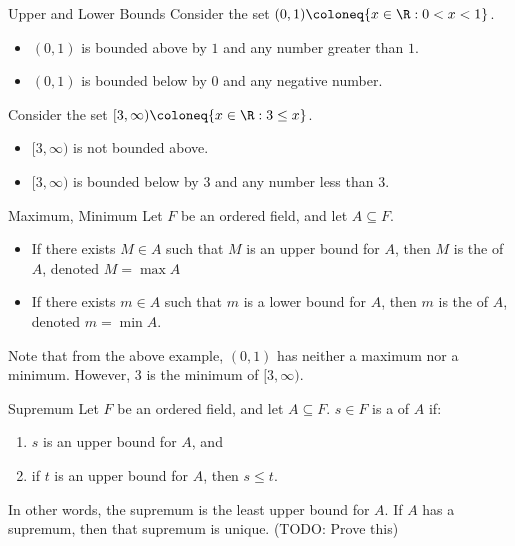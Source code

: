 \begin{exbox}{Upper and Lower Bounds}{}
    Consider the set $ (0,1) \coloneq \{ x \in \R : 0<x<1\}$.
    \begin{itemize}[noitemsep]
        \item $(0,1)$ is bounded above by $1$ and any number greater than $1$.
        \item $(0,1)$ is bounded below by $0$ and any negative number.
    \end{itemize}
    Consider the set $[3, \infty) \coloneq \{ x \in \R : 3 \leq x \}$.
    \begin{itemize}[noitemsep]
        \item $[3, \infty)$ is not bounded above.
        \item $[3, \infty)$ is bounded below by $3$ and any number less than $3$.
    \end{itemize}
\end{exbox}

\begin{dfnbox}{Maximum, Minimum}{}
    Let $F$ be an ordered field, and let $A \subseteq F$.
    \begin{itemize}[noitemsep]
        \item If there exists $M \in A$ such that $M$ is an upper bound for $A$, then $M$ is the  of $A$, denoted $M = \max A$
        \item If there exists $m \in A$ such that $m$ is a lower bound for $A$, then $m$ is the  of $A$, denoted $m = \min A$.
    \end{itemize}
\end{dfnbox}

Note that from the above example, $(0,1)$ has neither a maximum nor a minimum. However, 3 is the minimum of $[3,\infty)$.

\begin{dfnbox}{Supremum}{}
    Let $F$ be an ordered field, and let $A \subseteq F$. $s \in F$ is a  of $A$ if:
    \begin{enumerate}
        \item $s$ is an upper bound for $A$, and
        \item if $t$ is an upper bound for $A$, then $s \leq t$.
    \end{enumerate}
\end{dfnbox}

In other words, the supremum is the least upper bound for $A$. If $A$ has a supremum, then that supremum is unique. (TODO: Prove this)

